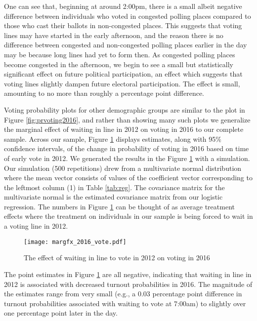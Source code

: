 \documentclass[12pt,titlepage]{article}
\begin{document}
One can see that, beginning at around 2:00pm, there is a small albeit
negative difference between individuals who voted in congested polling
places compared to those who cast their ballots in non-congested
places.  This suggests that voting lines may have started in the early
afternoon, and the reason there is no difference between congested and
non-congested polling places earlier in the day may be because long
lines had yet to form then. As congested polling places become
congested in the afternoon, we begin to see a small but statistically
significant effect on future political participation, an effect which
suggests that voting lines slightly dampen future electoral
participation.  The effect is small, amounting to no more than roughly
a percentage point difference.

Voting probability plots for other demographic groups are similar to
the plot in Figure \ref{fig:prvoting2016}, and rather than showing
many such plots we generalize the marginal effect of waiting in line
in 2012 on voting in 2016 to our complete sample.  Across our sample,
Figure \ref{fig:margfx2016} displays estimates, along with 95\%
confidence intervals, of the change in probability of voting in 2016
based on time of early vote in 2012.  We generated the results in the
Figure \ref{fig:margfx2016} with a simulation.  Our simulation (500
repetitions) drew from a multivariate normal distribution where the
mean vector consists of values of the coefficient vector corresponding
to the leftmost column (1) in Table \ref{tab:reg}.  The covariance
matrix for the multivariate normal is the estimated covariance matrix
from our logistic regression.  The numbers in Figure
\ref{fig:margfx2016} can be thought of as average treatment effects
where the treatment on individuals in our sample is being forced to
wait in a voting line in 2012.

%

\begin{figure}[!ht]
\caption{The effect of waiting in line to vote in 2012 on voting in 2016}
  \label{fig:margfx2016}
  \centering
    \centering\texttt{[image: margfx\_2016\_vote.pdf]}
\end{figure}


The point estimates in Figure \ref{fig:margfx2016} are all negative,
indicating that waiting in line in 2012 is associated with decreased
turnout probabilities in 2016.  The magnitude of the estimates range
from very small (e.g., a 0.03 percentage point difference in turnout
probabilities associated with waiting to vote at 7:00am) to slightly
over one percentage point later in the day.
\end{document}

